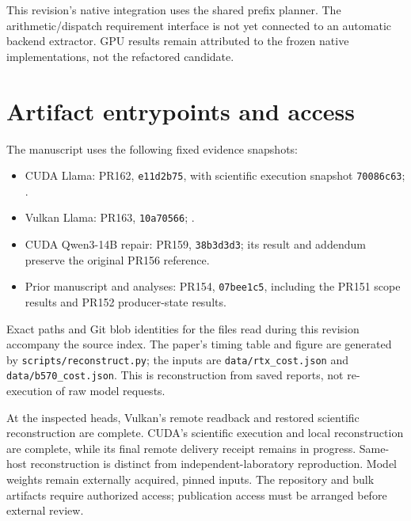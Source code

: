 This revision's native integration uses the shared prefix planner. The arithmetic/dispatch requirement interface is not yet connected to an automatic backend extractor. GPU results remain attributed to the frozen native implementations, not the refactored candidate.

\section{Artifact entrypoints and access}
\label{app:artifacts}
The manuscript uses the following fixed evidence snapshots:
\begin{itemize}[itemsep=2pt]
\item CUDA Llama: PR162, \texttt{e11d2b75}, with scientific execution snapshot \texttt{70086c63}; .
\item Vulkan Llama: PR163, \texttt{10a70566}; .
\item CUDA Qwen3-14B repair: PR159, \texttt{38b3d3d3}; its result and addendum preserve the original PR156 reference.
\item Prior manuscript and analyses: PR154, \texttt{07bee1c5}, including the PR151 scope results and PR152 producer-state results.
\end{itemize}
Exact paths and Git blob identities for the files read during this revision accompany the source index. The paper's timing table and figure are generated by \texttt{scripts/reconstruct.py}; the inputs are \texttt{data/rtx\_cost.json} and \texttt{data/b570\_cost.json}. This is reconstruction from saved reports, not re-execution of raw model requests.

At the inspected heads, Vulkan's remote readback and restored scientific reconstruction are complete. CUDA's scientific execution and local reconstruction are complete, while its final remote delivery receipt remains in progress. Same-host reconstruction is distinct from independent-laboratory reproduction. Model weights remain externally acquired, pinned inputs. The repository and bulk artifacts require authorized access; publication access must be arranged before external review.
